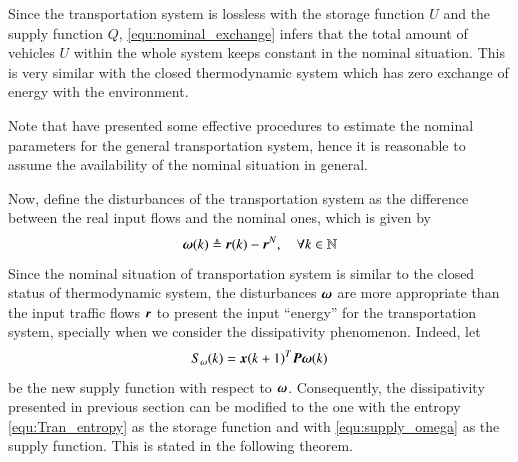 \documentclass[preprint,authoryear,12pt]{elsarticle}
\renewcommand{\vec}[1]{\mbox{\boldmath$#1$}}
\newcommand{\mat}[1]{\mbox{\boldmath$#1$}}
\begin{document}
Since the transportation system is lossless with the storage function $U$ and the supply function $Q$, \eqref{equ:nominal_exchange} infers that the total amount of vehicles $U$ within the whole system keeps constant in the nominal situation. This is very similar with the closed thermodynamic system which has zero exchange of energy with the environment.

Note that \citet{de_oliveira_multi-agent_2010} have presented some effective procedures to estimate the nominal parameters for the general transportation system, hence it is reasonable to assume the availability of the nominal situation in general.

Now, define the disturbances of the transportation system as the difference between the real input flows and the nominal ones, which is given by
\begin{equation}
\vec{\omega}(k)\triangleq\vec{r}(k)-\vec{r}^N, \quad \forall k\in\mathbb{N}
\end{equation}
Since the nominal situation of transportation system is similar to the closed status of thermodynamic system, the disturbances $\vec{\omega}$ are more appropriate than the input traffic flows $\vec{r}$ to present the input ``energy'' for the transportation system, specially when we consider the dissipativity phenomenon. Indeed, let
\begin{equation}\label{equ:supply_omega}
  S_\omega(k) = \vec{x}(k+1)^T \mat{P} \vec{\omega}(k)
\end{equation}
be the new supply function with respect to $\vec{\omega}$. Consequently, the dissipativity presented in previous section can be modified to the one with the entropy \eqref{equ:Tran_entropy} as the storage function and with \eqref{equ:supply_omega} as the supply function. This is stated in the following theorem.
\end{document}
